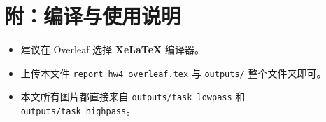 \documentclass[UTF8,a4paper,12pt]{ctexart}
\begin{document}
\section*{附：编译与使用说明}
\begin{itemize}
  \item 建议在 Overleaf 选择 \textbf{XeLaTeX} 编译器。
  \item 上传本文件 \texttt{report\_hw4\_overleaf.tex} 与 \texttt{outputs/} 整个文件夹即可。
  \item 本文所有图片都直接来自 \texttt{outputs/task\_lowpass} 和 \texttt{outputs/task\_highpass}。
\end{itemize}
\end{document}
